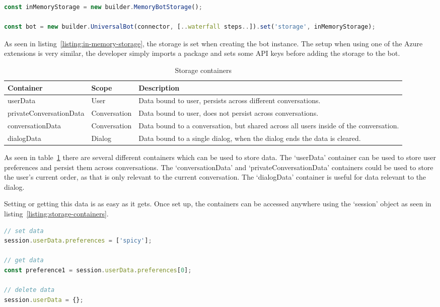 \begin{lstlisting}[language=JavaScript,caption={Example on how to set up the in-memory data storage},label={listing:in-memory-storage}]
const inMemoryStorage = new builder.MemoryBotStorage();

const bot = new builder.UniversalBot(connector, [..waterfall steps..]).set('storage', inMemoryStorage);
\end{lstlisting}

As seen in listing~\ref{listing:in-memory-storage}, the storage is set when creating the bot instance. The setup when using one of the Azure extensions is very similar, the developer simply imports a package and sets some API keys before adding the storage to the bot.

\begin{table}[h]
	\centering
	\begin{tabular}{p{} | p{} | p{}}
	Container & Scope & Description\\
	\hline
	userData & User & Data bound to user, persists across different conversations.\\
	privateConversationData & Conversation & Data bound to user, does not persist across conversations.\\
	conversationData & Conversation & Data bound to a conversation, but shared across all users inside of the conversation.\\
	dialogData & Dialog & Data bound to a single dialog, when the dialog ends the data is cleared.
	\end{tabular}
	\caption{Storage containers}
	\label{tab:storage-containers}
\end{table}

As seen in table~\ref{tab:storage-containers} there are several different containers which can be used to store data. The `userData' container can be used to store user preferences and persist them across conversations. The `conversationData' and `privateConversationData' containers could be used to store the user's current order, as that is only relevant to the current conversation. The `dialogData' container is useful for data relevant to the dialog.

Setting or getting this data is as easy as it gets. Once set up, the containers can be accessed anywhere using the `session' object as seen in listing~\ref{listing:storage-containers}.

\begin{lstlisting}[language=JavaScript,caption={Example on how to use the storage containers},label={listing:storage-containers}]
// set data
session.userData.preferences = ['spicy']; 

// get data
const preference1 = session.userData.preferences[0];

// delete data
session.userData = {};
\end{lstlisting}
	